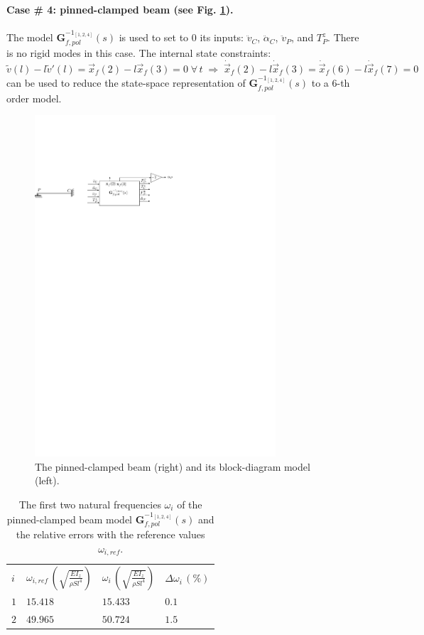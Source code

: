 \documentclass[smallcondensed]{svjour3}     %
\begin{document}
\FloatBarrier
\paragraph{Case \# 4: pinned-clamped beam (see Fig. \ref{fig:Tpc}).} The model $\mathbf{G}_{f,pol}^{-1_{[1,2,4]}}(s)$ is used to set to $0$ its inputs: $\ddot{v}_C$, $\ddot{\alpha}_C$, $\ddot{v}_P$, and $T^z_P$. There is no rigid modes in this case. The internal state constraints:
\[
\widetilde{v}(l)-l\widetilde{v}'(l)=\vec{x}_f(2)-l\vec{x}_f(3)=0\;\forall\,t\;\Rightarrow\;\dot{\vec{x}}_f(2)-l\dot{\vec{x}}_f(3)=\dot{\vec{x}}_f(6)-l\dot{\vec{x}}_f(7)=0
\]
can be used to reduce the state-space representation of $\mathbf{G}_{f,pol}^{-1_{[1,2,4]}}(s)$ to a $6$-th order model.
\begin{figure}[htbp!]
  \includegraphics[width=0.8\textwidth]{Tpcb}
\caption{The pinned-clamped beam (right) and its block-diagram model (left).}
\label{fig:Tpc} 
\end{figure}
\begin{table}[htbp!]
\caption{The first two natural frequencies $\omega_i$ of the pinned-clamped beam model $\mathbf{G}_{f,pol}^{-1_{[1,2,4]}}(s)$ and the relative errors with the reference values $\omega_{i,ref}$.}
\label{tab:Tpc}       %
\begin{tabular}{llll}
\hline\noalign{\smallskip}
  $i$ & $\omega_{i,ref}\,\left(\sqrt{\frac{EI_z}{\rho S l^4}}\right)$ &  $\omega_i\,\left(\sqrt{\frac{EI_z}{\rho S l^4}}\right)$ &  $\Delta \omega_i\,(\%)$ \\
\noalign{\smallskip}\hline\noalign{\smallskip}
$1$ & $15.418$ & $15.433$  & $0.1$ \\ 
$2$ & $49.965$ & $50.724$ & $1.5$ \\
\hline
\end{tabular}
\end{table}
\end{document}
